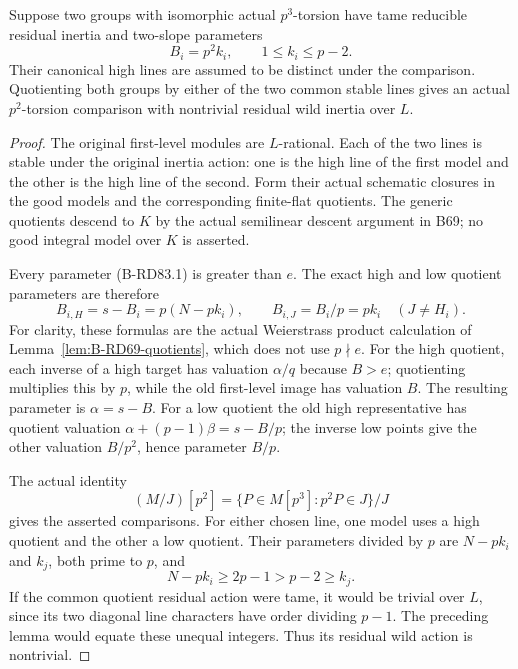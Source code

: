 \begin{lemma}
\label{lem:B-RD83-quotients}
Suppose two groups with isomorphic actual \(p^3\)-torsion
have tame reducible residual inertia and two-slope parameters
\[
                 B_i=p^2k_i,\qquad1\le k_i\le p-2.
                                                        \tag{B-RD83.1}
\]
Their canonical high lines are assumed to be distinct under
the comparison. Quotienting both groups by either of the two
common stable lines gives an actual \(p^2\)-torsion comparison
with nontrivial residual wild inertia over \(L\).
\end{lemma}
\begin{proof}
The original first-level modules are \(L\)-rational. Each
of the two lines is stable under the original inertia action:
one is the high line of the first model and the other is
the high line of the second. Form their actual schematic
closures in the good models and the corresponding finite-flat
quotients. The generic quotients descend to \(K\) by the
actual semilinear descent argument in B69; no good integral
model over \(K\) is asserted.

Every parameter (B-RD83.1) is greater than \(e\).
The exact high and low quotient parameters are therefore
\[
            B_{i,H}=s-B_i=p(N-pk_i),
       \qquad B_{i,J}=B_i/p=pk_i\quad(J\ne H_i).
                                                        \tag{B-RD83.2}
\]
For clarity, these formulas are the actual Weierstrass
product calculation of Lemma~\ref{lem:B-RD69-quotients},
which does not use \(p\nmid e\). For the high quotient,
each inverse of a high target has valuation \(\alpha/q\)
because \(B>e\); quotienting multiplies this by \(p\),
while the old first-level image has valuation \(B\).
The resulting parameter is \(\alpha=s-B\). For a low
quotient the old high representative has quotient valuation
\(\alpha+(p-1)\beta=s-B/p\); the inverse low points
give the other valuation \(B/p^2\), hence parameter \(B/p\).

The actual identity
\[
 (M/J)[p^2]=\{P\in M[p^3]:p^2P\in J\}/J              \tag{B-RD83.3}
\]
gives the asserted comparisons. For either chosen line,
one model uses a high quotient and the other a low quotient.
Their parameters divided by \(p\) are \(N-pk_i\) and
\(k_j\), both prime to \(p\), and
\[
                  N-pk_i\ge2p-1>p-2\ge k_j.          \tag{B-RD83.4}
\]
If the common quotient residual action were tame, it would
be trivial over \(L\), since its two diagonal line
characters have order dividing \(p-1\). The preceding
lemma would equate these unequal integers. Thus its
residual wild action is nontrivial.
\end{proof}

